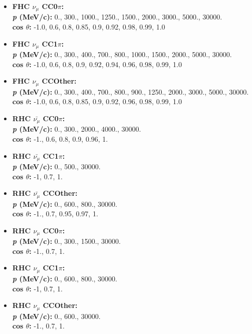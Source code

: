 \begin{itemize}
\setlength\itemsep{1mm}
\item \textbf{FHC $\nu_{\mu}$ CC0$\pi$:}\\
\textbf{\textit{p} (MeV/c):} 0., 300., 1000., 1250., 1500., 2000., 3000., 5000., 30000.\\
\textbf{cos $\theta$:} -1.0, 0.6, 0.8, 0.85, 0.9, 0.92, 0.98, 0.99, 1.0

\item \textbf{FHC $\nu_{\mu}$ CC1$\pi$:}\\
\textbf{\textit{p} (MeV/c):} 0., 300., 400., 700., 800., 1000., 1500., 2000., 5000., 30000.\\
\textbf{cos $\theta$:} -1.0, 0.6, 0.8, 0.9, 0.92, 0.94, 0.96, 0.98, 0.99, 1.0

\item \textbf{FHC $\nu_{\mu}$ CCOther:} \\
\textbf{\textit{p} (MeV/c):} 0., 300., 400., 700., 800., 900., 1250., 2000., 3000., 5000., 30000.\\
\textbf{cos $\theta$:} -1.0, 0.6, 0.8, 0.85, 0.9, 0.92, 0.96, 0.98, 0.99, 1.0

\item \textbf{RHC $\bar{\nu_{\mu}}$ CC0$\pi$:}\\
\textbf{\textit{p} (MeV/c):} 0., 300., 2000., 4000., 30000.\\
\textbf{cos $\theta$:} -1., 0.6, 0.8, 0.9, 0.96, 1.

\item \textbf{RHC $\bar{\nu_{\mu}}$ CC1$\pi$:}\\
\textbf{\textit{p} (MeV/c):} 0., 500., 30000.\\
\textbf{cos $\theta$:} -1, 0.7, 1.

\item \textbf{RHC $\bar{\nu_{\mu}}$ CCOther:}\\
\textbf{\textit{p} (MeV/c):} 0., 600., 800., 30000.\\
\textbf{cos $\theta$:} -1., 0.7, 0.95, 0.97, 1.

\item \textbf{RHC $\nu_{\mu}$ CC0$\pi$:}\\
\textbf{\textit{p} (MeV/c):} 0., 300., 1500., 30000.\\
\textbf{cos $\theta$:} -1., 0.7, 1.

\item \textbf{RHC $\nu_{\mu}$ CC1$\pi$:}\\
\textbf{\textit{p} (MeV/c):} 0., 600., 800., 30000.\\
\textbf{cos $\theta$:} -1, 0.7, 1.

\item \textbf{RHC $\nu_{\mu}$ CCOther:}\\
\textbf{\textit{p} (MeV/c):} 0., 600., 30000.\\
\textbf{cos $\theta$:} -1., 0.7, 1.

\end{itemize}

